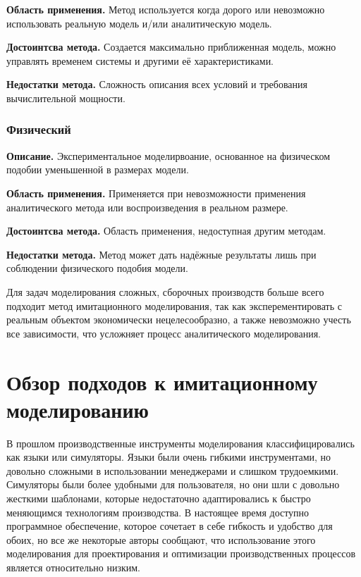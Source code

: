 \textbf{Область применения.} Метод используется когда дорого или невозможно использовать реальную модель и/или аналитическую модель.

\textbf{Достоинтсва метода.} Создается максимально приближенная модель, можно управлять временем системы и другими её характеристиками.

\textbf{Недостатки метода.} Сложность описания всех условий и требования вычислительной мощности.

\subsubsection{Физический}
\textbf{Описание.} Экспериментальное моделирвоание, основанное на физическом подобии уменьшенной в размерах модели.

\textbf{Область применения.} Применяется при невозможности применения аналитического метода или воспроизведения в реальном размере.

\textbf{Достоинтсва метода.} Область применения, недоступная другим методам.

\textbf{Недостатки метода.} Метод может дать надёжные результаты лишь при соблюдении физического подобия модели.

Для задач моделирования сложных, сборочных производств больше всего подходит метод имитационного моделирования, так как эксперементировать с реальным объектом экономически нецелесообразно, а также невозможно учесть все зависимости, что усложняет процесс аналитического моделирования.

\section{Обзор подходов к имитационному моделированию}

В прошлом производственные инструменты моделирования классифицировались как языки или симуляторы. \cite{Velazco} Языки были очень гибкими инструментами, но довольно сложными в использовании менеджерами и слишком трудоемкими. Симуляторы были более удобными для пользователя, но они шли с довольно жесткими шаблонами, которые недостаточно адаптировались к быстро меняющимся технологиям производства. В настоящее время доступно программное обеспечение, которое сочетает в себе гибкость и удобство для обоих, но все же некоторые авторы сообщают, что использование этого моделирования для проектирования и оптимизации производственных процессов является относительно низким. \cite{Benedettini} \cite{Holst}

